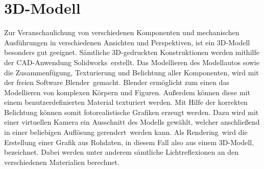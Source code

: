 \section{3D-Modell}
\label{sec:3Dmodel}
Zur Veranschaulichung von verschiedenen Komponenten und mechanischen Ausführungen in verschiedenen Ansichten und Perspektiven, ist ein 3D-Modell besonders gut geeignet. Sämtliche 3D-gedruckten Konstruktionen werden mithilfe der \ac{CAD}-Anwendung \glqq Solidworks\grqq\ erstellt. Das Modellieren des Modellautos sowie die Zusammenfügung, Texturierung und Belichtung aller Komponenten, wird mit der freien Software \glqq Blender\grqq\ gemacht. Blender ermöglicht zum einen das Modellieren von komplexen Körpern und Figuren. Außerdem können diese mit einem benutzerdefinierten Material texturiert werden. Mit Hilfe der korrekten Belichtung können somit fotorealistische Grafiken erzeugt werden. Dazu wird mit einer virtuellen Kamera ein Ausschnitt des Modells gewählt, welcher anschließend in einer beliebigen Auflösung \glqq gerendert\grqq\ werden kann. Als \glqq Rendering\grqq\ wird die Erstellung einer Grafik aus Rohdaten, in diesem Fall also aus einem 3D-Modell, bezeichnet. Dabei werden unter anderem sämtliche Lichtreflexionen an den verschiedenen Materialien berechnet.